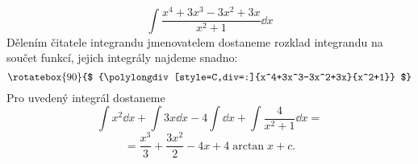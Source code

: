 \begin{mdframed}[style=mdexam]
  \begin{example}\label{MAI:exam121} 
    \[\int{\frac{x^4+3x^3-3x^2+3x}{x^2+1}\dd{x}}\]
    Dělením čitatele integrandu jmenovatelem dostaneme rozklad integrandu na součet funkcí, jejich
    integrály najdeme snadno:
    \begin{equation*}
      \rotatebox{90}{$
        {\polylongdiv[style=C,div=:]{x^4+3x^3-3x^2+3x}{x^2+1}}
      $}
    \end{equation*}
    Pro uvedený integrál dostaneme
    \begin{equation*}
      \int{x^2}\dd{x} +\int{3x}\dd{x}-4\int\dd{x}+\int{\frac{4}{x^2+1}\dd{x}} = 
    \end{equation*}
    \begin{equation*}
      = \frac{x^3}{3}+\frac{3x^2}{2}-4x+4\arctan x + c.
    \end{equation*}
  \end{example}
\end{mdframed}